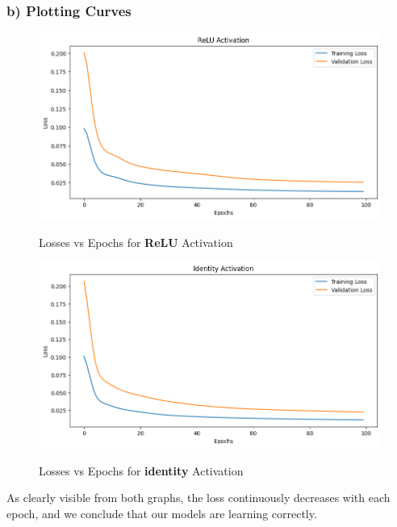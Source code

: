 \documentclass{article}
\begin{document}
\subsubsection*{b) Plotting Curves}
\begin{figure}[H] %
    \centering
    \begin{minipage}{0.49\linewidth}
        \centering
        \includegraphics[width=\linewidth]{assets/4-relu.png}
        \caption{Losses vs Epochs for \textbf{ReLU} Activation}{}
        \label{fig:b-1}
    \end{minipage}
    \hfill
    \begin{minipage}{0.49\linewidth}
        \centering
        \includegraphics[width=\linewidth]{assets/4-identity.png}
        \caption{Losses vs Epochs for \textbf{identity} Activation}{}
        \label{fig:b-2}
    \end{minipage}
\end{figure}

As clearly visible from both graphs, the loss continuously decreases with each epoch, and we conclude that our models are learning correctly.
\end{document}
